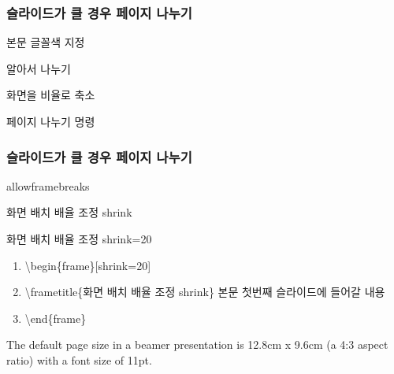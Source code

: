 \documentclass[ aspectratio=169,  10pt,blue,xcolor=pdftex,dvipsnames,table,handout,notes]{beamer}
\begin{document}
		\begin{frame}[c]
		\frametitle{슬라이드가 클 경우 페이지 나누기}

			\begin{block} {본문 글꼴색 지정}
			\begin{description}[12345678901234567890]
			\item[allowframebreaks] 알아서 나누기 
			\item[shrink] 화면을 비율로 축소
			\item[] 페이지 나누기 명령
			\end{description}
			\end{block}


		\end{frame}




		\begin{frame}[c]
		\frametitle{슬라이드가 클 경우 페이지 나누기}

			\begin{block} {allowframebreaks}
			\end{block}


		\end{frame}


		\begin{frame}[shrink=20]{화면 배치 배율 조정 shrink}
			
			\begin{block} {화면 배치 배율 조정 shrink=20}

			\begin{enumerate}
			\item[]	\textbackslash begin\{frame\}[shrink=20]
			\item[]	\textbackslash frametitle\{화면 배치 배율 조정 shrink\}
					본문 첫번째 슬라이드에 들어갈 내용\\
			\item[]	\textbackslash end\{frame\}
			\end{enumerate}

			\end{block}

			The default page size in a beamer presentation is 12.8cm x 9.6cm (a 4:3 aspect ratio) with a font size of 11pt.

		\end{frame}
\end{document}
